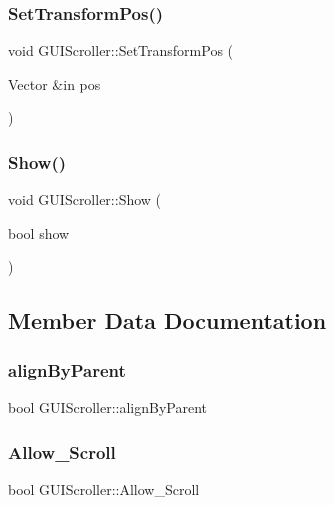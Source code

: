 \subsubsection{\texorpdfstring{Set\+Transform\+Pos()}{SetTransformPos()}}
{\footnotesize\ttfamily void G\+U\+I\+Scroller\+::\+Set\+Transform\+Pos (\begin{DoxyParamCaption}\item[{Vector \&in}]{pos }\end{DoxyParamCaption})}

\hypertarget{class_g_u_i_scroller_a6700ed07ffb74193eb92e07f4d4fbe79}{}\label{class_g_u_i_scroller_a6700ed07ffb74193eb92e07f4d4fbe79} 
\subsubsection{\texorpdfstring{Show()}{Show()}}
{\footnotesize\ttfamily void G\+U\+I\+Scroller\+::\+Show (\begin{DoxyParamCaption}\item[{bool}]{show }\end{DoxyParamCaption})}



\subsection{Member Data Documentation}
\hypertarget{class_g_u_i_scroller_a1abf45327b9829fe8073a92c47c40fd2}{}\label{class_g_u_i_scroller_a1abf45327b9829fe8073a92c47c40fd2} 
\subsubsection{\texorpdfstring{align\+By\+Parent}{alignByParent}}
{\footnotesize\ttfamily bool G\+U\+I\+Scroller\+::align\+By\+Parent}

\hypertarget{class_g_u_i_scroller_a74ebbe4ef5c5adc7bb3794172b49d8cb}{}\label{class_g_u_i_scroller_a74ebbe4ef5c5adc7bb3794172b49d8cb} 
\subsubsection{\texorpdfstring{Allow\+\_\+\+Scroll}{Allow\_Scroll}}
{\footnotesize\ttfamily bool G\+U\+I\+Scroller\+::\+Allow\+\_\+\+Scroll}

